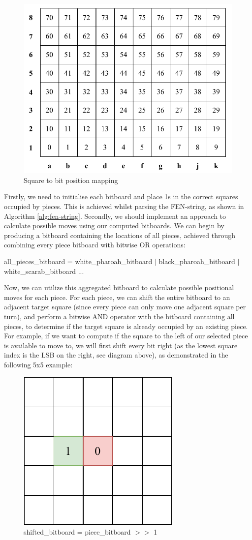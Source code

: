 \documentclass[../main/main.tex]{subfiles}
\begin{document}
\begin{figure}[H]
    \centering
    \includegraphics[width=0.6\columnwidth]{../design/assets/bitboard_indexes.pdf}
    \caption{Square to bit position mapping}
    \label{fig:bitboard-indexes}
\end{figure}

Firstly, we need to initialise each bitboard and place 1s in the correct squares occupied by pieces. This is achieved whilst parsing the FEN-string, as shown in Algorithm \ref{alg:fen-string}.
Secondly, we should implement an approach to calculate possible moves using our computed bitboards. We can begin by producing a bitboard containing the locations of all pieces, achieved through combining every piece bitboard with bitwise OR operations:

\begin{center}
all\_pieces\_bitboard = white\_pharoah\_bitboard $\vert$  black\_pharoah\_bitboard $\vert$ white\_scarab\_bitboard ...
\end{center}

Now, we can utilize this aggregated bitboard to calculate possible positional moves for each piece.
For each piece, we can shift the entire bitboard to an adjacent target square (since every piece can only move one adjacent square per turn), and perform a bitwise AND operator with the bitboard containing all pieces, to determine if the target square is already occupied by an existing piece. For example, if we want to compute if the square to the left of our selected piece is available to move to, we will first shift every bit right (as the lowest square index is the LSB on the right, see diagram above), as demonstrated in the following 5x5 example:

\begin{figure}[H]
    \centering
    \includegraphics[width=0.4\columnwidth]{../design/assets/bitboard_shifted.pdf}
    \caption{shifted\_bitboard = piece\_bitboard $>>$ 1}
    \label{fig:bitboard-shifted}
\end{figure}
\end{document}
